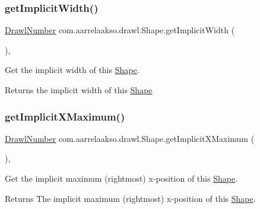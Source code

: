 \subsubsection{\texorpdfstring{get\+Implicit\+Width()}{getImplicitWidth()}}
{\footnotesize\ttfamily \hyperlink{classcom_1_1aarrelaakso_1_1drawl_1_1_drawl_number}{Drawl\+Number} com.\+aarrelaakso.\+drawl.\+Shape.\+get\+Implicit\+Width (\begin{DoxyParamCaption}{ }\end{DoxyParamCaption})\hspace{0.3cm}{\ttfamily [protected]}, {\ttfamily [inherited]}}



Get the implicit width of this \hyperlink{classcom_1_1aarrelaakso_1_1drawl_1_1_shape}{Shape}. 

\begin{DoxyReturn}{Returns}
the implicit width of this \hyperlink{classcom_1_1aarrelaakso_1_1drawl_1_1_shape}{Shape} 
\end{DoxyReturn}
\mbox{\label{classcom_1_1aarrelaakso_1_1drawl_1_1_shape_ae1820c7d674c6c022b72cc086005131f}} 
\subsubsection{\texorpdfstring{get\+Implicit\+X\+Maximum()}{getImplicitXMaximum()}}
{\footnotesize\ttfamily \hyperlink{classcom_1_1aarrelaakso_1_1drawl_1_1_drawl_number}{Drawl\+Number} com.\+aarrelaakso.\+drawl.\+Shape.\+get\+Implicit\+X\+Maximum (\begin{DoxyParamCaption}{ }\end{DoxyParamCaption})\hspace{0.3cm}{\ttfamily [protected]}, {\ttfamily [inherited]}}



Get the implicit maximum (rightmost) x-\/position of this \hyperlink{classcom_1_1aarrelaakso_1_1drawl_1_1_shape}{Shape}. 

\begin{DoxyReturn}{Returns}
The implicit maximum (rightmost) x-\/position of this \hyperlink{classcom_1_1aarrelaakso_1_1drawl_1_1_shape}{Shape}. 
\end{DoxyReturn}
\mbox{\label{classcom_1_1aarrelaakso_1_1drawl_1_1_shape_a43b7aaf82c47e231b57622b0346d3ce1}} 
